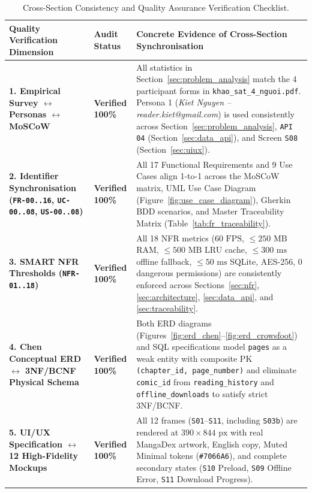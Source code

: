 \begin{table}[H]
\centering
\caption{Cross-Section Consistency and Quality Assurance Verification Checklist.}
\label{tab:qa_checklist}
\footnotesize
\renewcommand{\arraystretch}{1.22}
\begin{tabularx}{\textwidth}{L{4.8cm} C{2.2cm} Y}
\toprule
{}
\textbf{Quality Verification Dimension} & \textbf{Audit Status} & \textbf{Concrete Evidence of Cross-Section Synchronisation} \\
\midrule
\textbf{1. Empirical Survey $\leftrightarrow$ Personas $\leftrightarrow$ MoSCoW} & \textbf{Verified 100\%} & All statistics in Section~\ref{sec:problem_analysis} match the 4 participant forms in \texttt{khao\_sat\_4\_nguoi.pdf}. Persona 1 (\textit{Kiet Nguyen -- reader.kiet@gmail.com}) is used consistently across Section~\ref{sec:problem_analysis}, \texttt{API 04} (Section~\ref{sec:data_api}), and Screen \texttt{S08} (Section~\ref{sec:uiux}). \\
\textbf{2. Identifier Synchronisation (\texttt{FR-00..16}, \texttt{UC-00..08}, \texttt{US-00..08})} & \textbf{Verified 100\%} & All 17 Functional Requirements and 9 Use Cases align 1-to-1 across the MoSCoW matrix, UML Use Case Diagram (Figure~\ref{fig:use_case_diagram}), Gherkin BDD scenarios, and Master Traceability Matrix (Table~\ref{tab:fr_traceability}). \\
\textbf{3. SMART NFR Thresholds (\texttt{NFR-01..18})} & \textbf{Verified 100\%} & All 18 NFR metrics ($60\text{ FPS}$, $\le 250\text{ MB}$ RAM, $\le 500\text{ MB}$ LRU cache, $\le 300\text{ ms}$ offline fallback, $\le 50\text{ ms}$ SQLite, AES-256, 0 dangerous permissions) are consistently enforced across Sections~\ref{sec:nfr}, \ref{sec:architecture}, \ref{sec:data_api}, and \ref{sec:traceability}. \\
\textbf{4. Chen Conceptual ERD $\leftrightarrow$ 3NF/BCNF Physical Schema} & \textbf{Verified 100\%} & Both ERD diagrams (Figures~\ref{fig:erd_chen}--\ref{fig:erd_crowsfoot}) and SQL specifications model \texttt{pages} as a weak entity with composite PK \texttt{(chapter\_id, page\_number)} and eliminate \texttt{comic\_id} from \texttt{reading\_history} and \texttt{offline\_downloads} to satisfy strict 3NF/BCNF. \\
\textbf{5. UI/UX Specification $\leftrightarrow$ 12 High-Fidelity Mockups} & \textbf{Verified 100\%} & All 12 frames (\texttt{S01}--\texttt{S11}, including \texttt{S03b}) are rendered at $390 \times 844\text{ px}$ with real MangaDex artwork, English copy, Muted Minimal tokens (\texttt{\#7066A6}), and complete secondary states (\texttt{S10} Preload, \texttt{S09} Offline Error, \texttt{S11} Download Progress). \\
\bottomrule
\end{tabularx}
\end{table}
